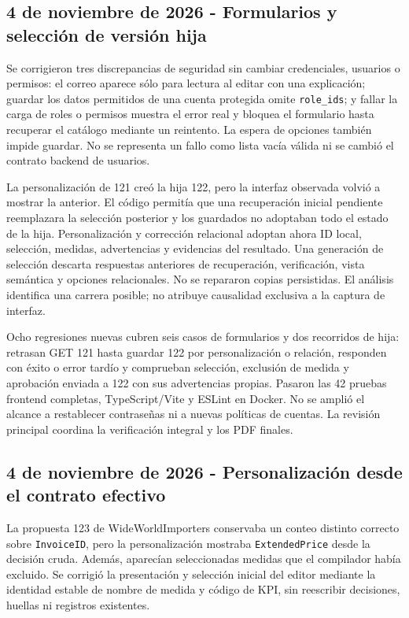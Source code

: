 \documentclass[11pt,letterpaper]{article}
\newcommand{\file}[1]{\texttt{#1}}
\begin{document}
\subsection{4 de noviembre de 2026 - Formularios y selección de versión hija}

Se corrigieron tres discrepancias de seguridad sin cambiar credenciales,
usuarios o permisos: el correo aparece sólo para lectura al editar con una
explicación; guardar los datos permitidos de una cuenta protegida omite
\file{role\_ids}; y fallar la carga de roles o permisos muestra el error real
y bloquea el formulario hasta recuperar el catálogo mediante un reintento.
La espera de opciones también impide guardar. No se representa un fallo como
lista vacía válida ni se cambió el contrato backend de usuarios.

La personalización de 121 creó la hija 122, pero la interfaz observada volvió
a mostrar la anterior. El código permitía que una recuperación inicial
pendiente reemplazara la selección posterior y los guardados no adoptaban
todo el estado de la hija. Personalización y corrección relacional adoptan
ahora ID local, selección, medidas, advertencias y evidencias del resultado.
Una generación de selección descarta respuestas anteriores de recuperación,
verificación, vista semántica y opciones relacionales. No se repararon copias
persistidas. El análisis identifica una carrera posible; no atribuye causalidad
exclusiva a la captura de interfaz.

Ocho regresiones nuevas cubren seis casos de formularios y dos recorridos de
hija: retrasan GET 121 hasta guardar 122 por personalización o relación,
responden con éxito o error tardío y comprueban selección, exclusión de medida
y aprobación enviada a 122 con sus advertencias propias. Pasaron las 42
pruebas frontend completas, TypeScript/Vite y ESLint en Docker. No se amplió
el alcance a restablecer contraseñas ni a nuevas políticas de cuentas.
La revisión principal coordina la verificación integral y los PDF finales.

\subsection{4 de noviembre de 2026 - Personalización desde el contrato efectivo}

La propuesta 123 de WideWorldImporters conservaba un conteo distinto correcto
sobre \file{InvoiceID}, pero la personalización mostraba \file{ExtendedPrice}
desde la decisión cruda. Además, aparecían seleccionadas medidas que el
compilador había excluido. Se corrigió la presentación y selección inicial del
editor mediante la identidad estable de nombre de medida y código de KPI,
sin reescribir decisiones, huellas ni registros existentes.
\end{document}
